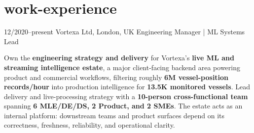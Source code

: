 \documentclass[]{../../../../friggeri-cv}
\begin{document}
\section{work-experience}
\begin{entrylist}
    \entry
    {12/2020--present}
    {Vortexa Ltd, London, UK}
    {Engineering Manager | ML Systems Lead}
    {
        {\small
        \setlength{\parindent}{0pt}
        \setlength{\leftskip}{0pt}
        Own the \textbf{engineering strategy and delivery} for Vortexa's \textbf{live ML and streaming intelligence estate}, a major client-facing backend area powering product and commercial workflows, filtering roughly \textbf{6M vessel-position records/hour} into production intelligence for \textbf{13.5K monitored vessels}. Lead delivery and live-processing strategy with a \textbf{10-person cross-functional team} spanning \textbf{6 MLE/DE/DS, 2 Product, and 2 SMEs}. The estate acts as an internal platform: downstream teams and product surfaces depend on its correctness, freshness, reliability, and operational clarity.

}}
\end{entrylist}
\end{document}
